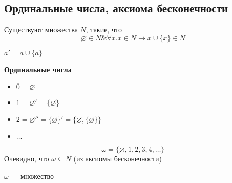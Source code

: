 \documentclass[english]{article}
\begin{document}
\subsection{Ординальные числа, аксиома бесконечности}
\label{sec:orgc1c2482}
\begin{axiom}
	Существуют множества \(N\), такие, что
	\[ \varnothing \in N \& \forall x. x \in N \to x \cup \{x\} \in N \]
	\label{orgd5ff5d3}
\end{axiom}
\begin{definition}
	\(a' = a \cup \{a\}\)
	\label{orgc6f66dc}
\end{definition}
\begin{definition}
	\textbf{Ординальные числа}
	\begin{itemize}
		\item \(\overline{0} = \varnothing\)
		\item \(\overline{1} = \varnothing' = \{\varnothing\}\)
		\item \(\overline{2} = \varnothing'' = \{\varnothing\}' = \{\varnothing, \{\varnothing\}\}\)
		\item \(\dots\)
	\end{itemize}
	\label{org71c17a9}
\end{definition}
\begin{examp}
	\[ \omega = \{\varnothing, 1, 2, 3, 4, \dots\} \]
	Очевидно, что \(\omega \subseteq N\) (из \hyperref[orgd5ff5d3]{аксиомы бесконечности})
	\label{orge2a1ac1}
\end{examp}
\begin{theorem}
	\(\omega\) --- множество
	\label{orgd8a95ef}
\end{theorem}
\end{document}
